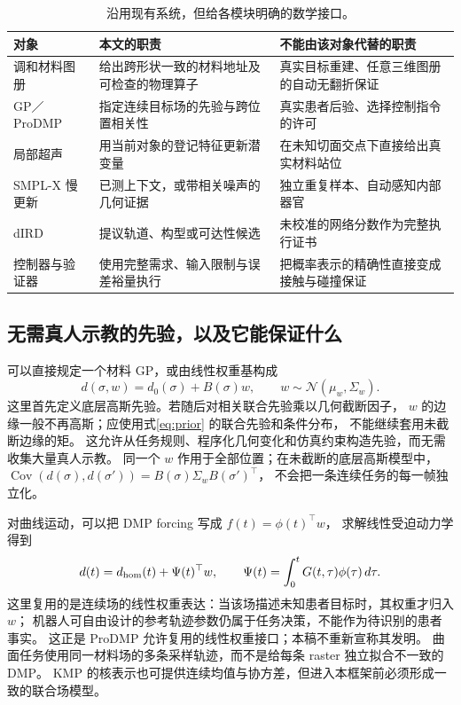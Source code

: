 \documentclass[11pt,a4paper]{article}
\numberwithin{equation}{section}
\theoremstyle{definition}
\newcommand{\N}{\mathcal N}
\DeclareMathOperator{\Cov}{Cov}
\begin{document}
\begin{table}[ht]
\centering\small
\begin{tabularx}{\linewidth}{p{.17\linewidth}YY}
\toprule
对象 & 本文的职责 & 不能由该对象代替的职责\\
\midrule
调和材料图册 & 给出跨形状一致的材料地址及可检查的物理算子 & 真实目标重建、任意三维图册的自动无翻折保证\\
GP／ProDMP & 指定连续目标场的先验与跨位置相关性 & 真实患者后验、选择控制指令的许可\\
局部超声 & 用当前对象的登记特征更新潜变量 & 在未知切面交点下直接给出真实材料站位\\
SMPL-X 慢更新 & 已测上下文，或带相关噪声的几何证据 & 独立重复样本、自动感知内部器官\\
dIRD & 提议轨道、构型或可达性候选 & 未校准的网络分数作为完整执行证书\\
控制器与验证器 & 使用完整需求、输入限制与误差裕量执行 & 把概率表示的精确性直接变成接触与碰撞保证\\
\bottomrule
\end{tabularx}
\caption{沿用现有系统，但给各模块明确的数学接口。}
\end{table}

\subsection{无需真人示教的先验，以及它能保证什么}
可以直接规定一个材料 GP，或由线性权重基构成
\begin{equation}
 d(\sigma,w)=d_0(\sigma)+B(\sigma)w,\qquad
 w\sim\N(\mu_w,\Sigma_w).
 \label{eq:field}
\end{equation}
这里首先定义底层高斯先验。若随后对相关联合先验乘以几何截断因子，
\(w\) 的边缘一般不再高斯；应使用式\eqref{eq:prior} 的联合先验和条件分布，
不能继续套用未截断边缘的矩。
这允许从任务规则、程序化几何变化和仿真约束构造先验，而无需收集大量真人示教。
同一个 \(w\) 作用于全部位置；在未截断的底层高斯模型中，
\(\Cov(d(\sigma),d(\sigma'))=B(\sigma)\Sigma_wB(\sigma')^\top\)，
不会把一条连续任务的每一帧独立化。

对曲线运动，可以把 DMP forcing 写成 \(f(t)=\phi(t)^\top w\)，
求解线性受迫动力学得到
\begin{equation}
 d(t)=d_{\rm hom}(t)+\Psi(t)^\top w,
 \qquad \Psi(t)=\int_0^tG(t,\tau)\phi(\tau)\,d\tau .
\end{equation}
这里复用的是连续场的线性权重表达：当该场描述未知患者目标时，其权重才归入 \(w\)；
机器人可自由设计的参考轨迹参数仍属于任务决策，不能作为待识别的患者事实。
这正是 ProDMP 允许复用的线性权重接口\cite{prodmp}；本稿不重新宣称其发明。
曲面任务使用同一材料场的多条采样轨迹，而不是给每条 raster 独立拟合不一致的 DMP。
KMP 的核表示也可提供连续均值与协方差，但进入本框架前必须形成一致的联合场模型\cite{kmp}。
\end{document}
